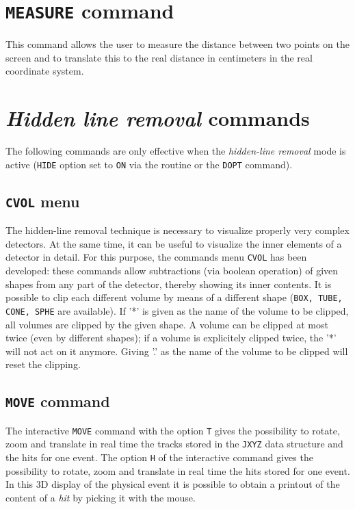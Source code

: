 \section{{\tt MEASURE} command}
This command allows the user to measure the
distance between two points on the screen
and to translate this to the real distance in centimeters in the real 
coordinate system.

\section{{\it Hidden line removal} commands}
The following commands are only effective when the {\it hidden-line 
removal} mode is active ({\tt HIDE} option set to {\tt ON} via the
 routine or the {\tt DOPT} command).

\subsection{{\tt CVOL} menu}
The hidden-line removal technique is necessary to visualize properly
very complex detectors. At the same time, it can be useful to visualize
the inner elements of a detector in detail. For this purpose, the
commands menu {\tt CVOL} has been developed: these commands allow
subtractions (via boolean operation) of given shapes from any part of
the detector, thereby showing its inner contents. It is possible
to clip each different volume by means of a different shape ({\tt BOX,
TUBE, CONE, SPHE} are available). If '*' is given as the name of the
volume to be clipped, all volumes are clipped by the given shape.
A volume can be clipped at most twice (even by
different shapes); if a volume is explicitely clipped
twice, the '*' will not act on it anymore. Giving '.' as the name
of the volume to be clipped will reset the clipping.

\subsection{{\tt MOVE} command}
The interactive
{\tt MOVE} command with the option {\tt T} gives the possibility
to rotate, zoom and translate in real time the tracks stored in the
{\tt JXYZ} data structure and the hits for one event.
The option {\tt H} of the interactive
 command gives the possibility
to rotate, zoom and translate in real time the hits stored for one event.
In this 3D display of the physical event it is
possible to obtain a printout of the content of a {\it hit} by picking
it with the mouse.


